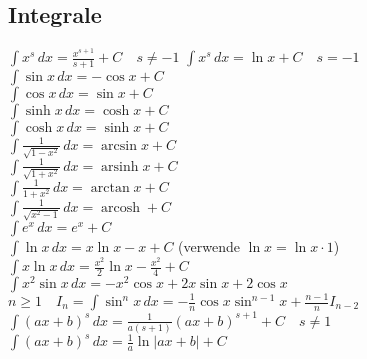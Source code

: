 \documentclass[10pt]{article}
\begin{document}
\subsection{Integrale}
$\int x^s\,dx=\frac{x^{s+1}}{s+1}+C\quad s\neq-1$\qquad
                $\int x^s\,dx=\ln x+C\quad s=-1$ \\
$\int\sin x\,dx=-\cos x+C$ \\
$\int\cos x\,dx=\sin x+C$\\
$\int\sinh x\,dx=\cosh x+C$\\
$\int\cosh x\,dx=\sinh x+C$\\
$\int\frac{1}{\sqrt{1-x^2}}\,dx=\arcsin x+C$\\
$\int\frac{1}{\sqrt{1+x^2}}\,dx=\operatorname{arsinh} x+C$\\
$\int\frac{1}{1+x^2}\,dx=\arctan x+C$\\
$\int\frac{1}{\sqrt{x^2-1}}\,dx=\operatorname{arcosh}+C$\\
$\int e^x\,dx=e^x+C$\\
$\int\ln x\,dx=x\ln x-x+C$ (verwende $\ln x=\ln x\cdot1$)\\
$\int x\ln x\,dx=\frac{x^2}{2}\ln x-\frac{x^2}{4}+C$\\
$\int x^2\sin x\,dx=-x^2\cos x+2x\sin x+2\cos x$ \\
$n\geqslant1\quad I_n=\int\sin^nx\,dx=-\frac{1}{n}\cos x\sin^{n-1}x
                +\frac{n-1}{n}I_{n-2}$\\
$\int(ax+b)^s\,dx=\frac{1}{a(s+1)}(ax+b)^{s+1}+C\quad s\neq1$\qquad
                $\int(ax+b)^s\,dx=\frac{1}{a}\ln|ax+b|+C$\\




\end{document}
